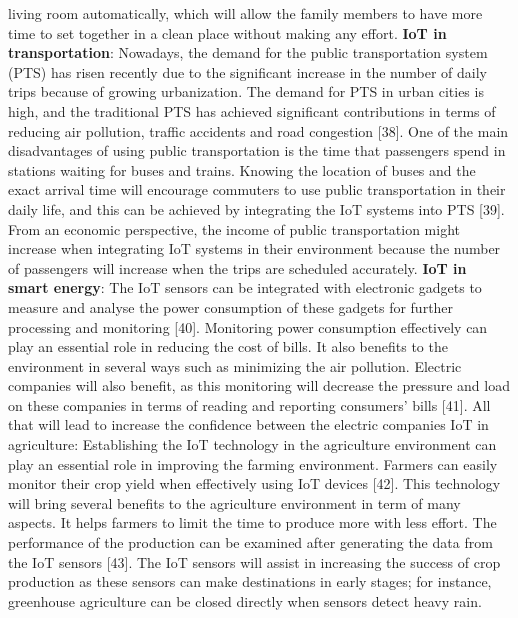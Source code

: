 \documentclass[pmlr,twocolumn,10pt]{jmlr} %
\begin{document}
living room automatically, which will allow the family 
members to have more time to set together in a clean place 
without making any effort. 
\newline 
\textbf{IoT in transportation}: Nowadays, the demand for the 
public transportation system (PTS) has risen recently due to 
the significant increase in the number of daily trips because 
of growing urbanization. The demand for PTS in urban 
cities is high, and the traditional PTS has achieved 
significant contributions in terms of reducing air pollution, 
traffic accidents and road congestion [38]. One of the main 
disadvantages of using public transportation is the time that 
passengers spend in stations waiting for buses and trains. 
Knowing the location of buses and the exact arrival time 
will encourage commuters to use public transportation in 
their daily life, and this can be achieved by integrating the 
IoT systems into PTS [39]. From an economic perspective, 
the income of public transportation might increase when 
integrating IoT systems in their environment because the 
number of passengers will increase when the trips are 
scheduled accurately. 
\newline 
\textbf{IoT in smart energy}: The IoT sensors can be integrated 
with electronic gadgets to measure and analyse the power 
consumption of these gadgets for further processing and 
monitoring [40]. Monitoring power consumption 
effectively can play an essential role in reducing the cost of 
bills. It also benefits to the environment in several ways 
such as minimizing the air pollution. Electric companies 
will also benefit, as this monitoring will decrease the 
pressure and load on these companies in terms of reading 
and reporting consumers' bills [41]. All that will lead to 
increase the confidence between the electric companies 
IoT in agriculture: Establishing the IoT technology in the 
agriculture environment can play an essential role in 
improving the farming environment. Farmers can easily 
monitor their crop yield when effectively using IoT devices 
[42]. This technology will bring several benefits to the 
agriculture environment in term of many aspects. It helps 
farmers to limit the time to produce more with less effort. 
The performance of the production can be examined after 
generating the data from the IoT sensors [43]. The IoT 
sensors will assist in increasing the success of crop 
production as these sensors can make destinations in early 
stages; for instance, greenhouse agriculture can be closed 
directly when sensors detect heavy rain. 
\newline 
\end{document}
